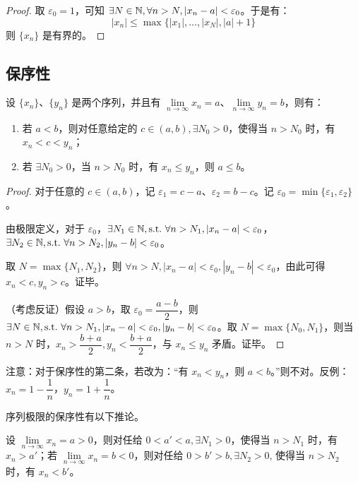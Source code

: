 \begin{proof}
	取 $\varepsilon_0 = 1$，可知 $\exists N \in \mathbb N, \forall n > N, |x_n - a| < \varepsilon_0$。于是有：
	$$
	|x_n| \le \max\{|x_1|, \ldots, |x_N|, |a| + 1\}
	$$
	则 $\{x_n\}$ 是有界的。
\end{proof}

\subsection{保序性}

\begin{theorem}[序列极限的保序性]
	设 $\{x_n\}$、$\{y_n\}$ 是两个序列，并且有 $\lim\limits_{n \rightarrow \infty} x_n = a$、$\lim\limits_{n \rightarrow \infty} y_n = b$，则有：

	\begin{enumerate}
		\item 若 $a < b$，则对任意给定的 $c \in (a, b), \exists N_0 > 0$，使得当 $n > N_0$ 时，有 $x_n < c < y_n$；
		\item 若 $\exists N_0 > 0$，当 $n > N_0$ 时，有 $x_n \le y_n$，则 $a \le b$。
	\end{enumerate}
\end{theorem}

\begin{proof}
	对于任意的 $c \in (a, b)$，记 $\varepsilon_1 = c - a$、$\varepsilon_2 = b - c$。记 $\varepsilon_0 = \min\{\varepsilon_1, \varepsilon_2\}$。

	由极限定义，对于 $\varepsilon_0$，$\exists N_1 \in \mathbb N, \text{s.t.~} \forall n > N_1, |x_n - a| < \varepsilon_0$，$\exists N_2 \in \mathbb N, \text{s.t.~} \forall n > N_2, |y_n - b| < \varepsilon_0$。

	取 $N = \max\{N_1, N_2\}$，则 $\forall n > N, |x_n - a| < \varepsilon_0, |y_n - b| < \varepsilon_0$，由此可得 $x_n < c, y_n > c$。证毕。

	\bigskip

	（考虑反证）假设 $a > b$，取 $\varepsilon_0 = \dfrac{a - b}{2}$，则 $\exists N \in \mathbb N, \text{s.t.~} \forall n > N_1, |x_n - a| < \varepsilon_0, |y_n - b| < \varepsilon_0$。取 $N = \max\{N_0, N_1\}$，则当 $n > N$ 时，$x_n > \dfrac{b + a}{2}, y_n < \dfrac{b + a}{2}$，与 $x_n \le y_n$ 矛盾。证毕。
\end{proof}

注意：对于保序性的第二条，若改为：“有 $x_n < y_n$，则 $a < b$。”则不对。反例：$x_n = 1 - \dfrac{1}{n}$，$y_n = 1 + \dfrac{1}{n}$。

序列极限的保序性有以下推论。

\begin{theorem}
	设 $\lim\limits_{n \rightarrow \infty} x_n = a > 0$，则对任给 $0 < a' < a, \exists N_1 > 0$，使得当 $n > N_1$ 时，有 $x_n > a'$；若 $\lim\limits_{n \rightarrow \infty} x_n = b < 0$，则对任给 $0 > b' > b, \exists N_2 > 0$, 使得当 $n > N_2$ 时，有 $x_n < b'$。
\end{theorem}

